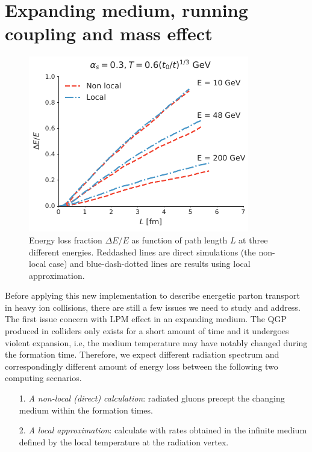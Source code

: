 \documentclass[aps, prc, reprint, amsmath, groupedaddress, nofootinbib]{revtex4-1}
\begin{document}
\section{Expanding medium, running coupling and mass effect}\label{section:disscuss}
\begin{figure}
\includegraphics[width=\columnwidth]{Bjorken.pdf}
\caption{Energy loss fraction $\Delta E /E$ as function of path length $L$ at three different energies. Reddashed lines are direct simulations (the non-local case) and blue-dash-dotted lines are results using local approximation.}
\label{fig:Bjorken}
\end{figure}
Before applying this new implementation to describe energetic parton transport in heavy ion collisions, there are still a few issues we need to study and address.
The first issue concern with LPM effect in an expanding medium. 
The QGP produced in colliders only exists for a short amount of time and it undergoes violent expansion, i.e, the medium temperature may have notably changed during the formation time.
Therefore, we expect different radiation spectrum and correspondingly different amount of energy loss between the following two computing scenarios.
\begin{itemize}
\item[1.]  {\it A non-local (direct) calculation}: radiated gluons precept the changing medium within the formation times.
\item[2.] {\it A local approximation}: calculate with rates obtained in the infinite medium defined by the local temperature at the radiation vertex.
\end{itemize} 
\end{document}
